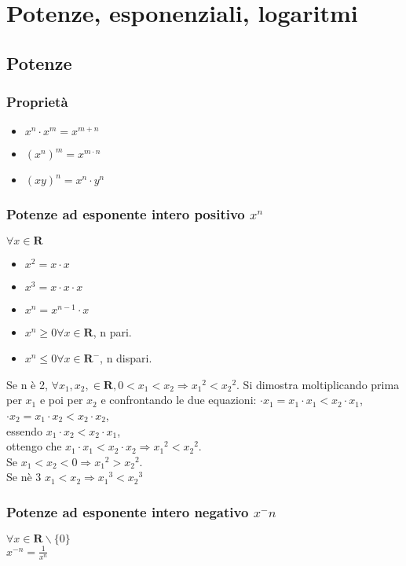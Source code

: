 \chapter{Potenze, esponenziali, logaritmi}
\section{Potenze}
\subsection{Propriet\`a}
\begin{itemize}
\item $x^n\cdot x^m =x^{m+n}$
\item $(x^n)^m=x^{m\cdot n}$
\item $(xy)^n=x^n\cdot y^n$
\end{itemize}
\subsection{Potenze ad esponente intero positivo $x^n$}
$\forall x \in \mathbf{R}$
\begin{itemize}
\item$x^2=x\cdot x$
\item$x^3=x\cdot x\cdot x$
\item$x^n=x^{n-1}\cdot x$
\item$x^n \ge 0 \forall x \in \mathbf{R}$, n pari.
\item$x^n \le 0 \forall x \in \mathbf{R^-}$, n dispari.
\end{itemize}
Se n \`e 2, $\forall x_1, x_2, \in \mathbf{R}, 0<x_1<x_2 \Rightarrow {x_1}^2 < {x_2}^2$. Si dimostra moltiplicando prima per $x_1$ e poi per $x_2$ e confrontando le due 
equazioni: $\cdot x_1= x_1\cdot x_1 < x_2\cdot x_1$,\\ $\cdot x_2= x_1\cdot x_2 < x_2\cdot x_2 $,\\ essendo $x_1\cdot x_2 < x_2\cdot x_1$,\\ ottengo che $x_1\cdot x_1 < x_2\cdot x_2 \Rightarrow {x_1}^2 < {x_2}^2$.\\ Se $x_1<x_2<0 \Rightarrow {x_1}^2 > {x_2}^2 $.\\ Se n\`e 3 $x_1<x_2 \Rightarrow  {x_1}^3 < {x_2}^3$
\subsection{Potenze ad esponente intero negativo $x^-n$}
$\forall x \in \mathbf{R}\backslash \{0\}$\\
$x^{-n}=\frac{1}{x^n}$
